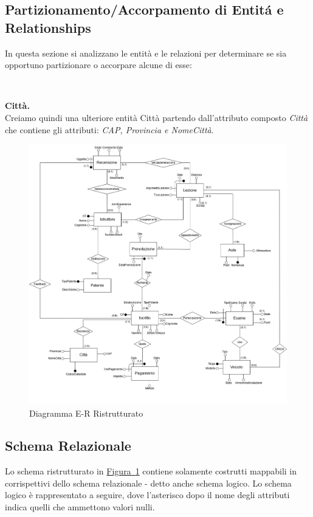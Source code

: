 \documentclass[10pt,twoside]{article}
\begin{document}
{    \subsection{Partizionamento/Accorpamento di Entitá e Relationships}{
        In questa sezione si analizzano le entità e le relazioni per determinare se sia opportuno partizionare o accorpare alcune di esse:

        \

        \textbf{Città.} \\ 
        Creiamo quindi una ulteriore entità Città partendo dall'attributo composto \textit{Città} che contiene gli attributi: \textit{CAP, Provincia e NomeCittà}. \\
    }

    \newpage

    \begin{figure}[H]        
        \includegraphics[width=1\linewidth]{img/ER_ScuolaGuidaRistrutturato.drawio.png}\centering
        \caption{Diagramma E-R Ristrutturato}
        \label{fig:diagrammaERristrutturato}
    \end{figure}

    \subsection{Schema Relazionale}{
        Lo schema ristrutturato in \hyperref[fig:diagrammaERristrutturato]{Figura~\ref*{fig:diagrammaERristrutturato}} contiene solamente costrutti mappabili in corrispettivi dello schema relazionale - detto anche schema logico. Lo schema logico è rappresentato a seguire, dove l’asterisco dopo il nome degli attributi indica quelli che ammettono valori nulli.

}}
\end{document}
